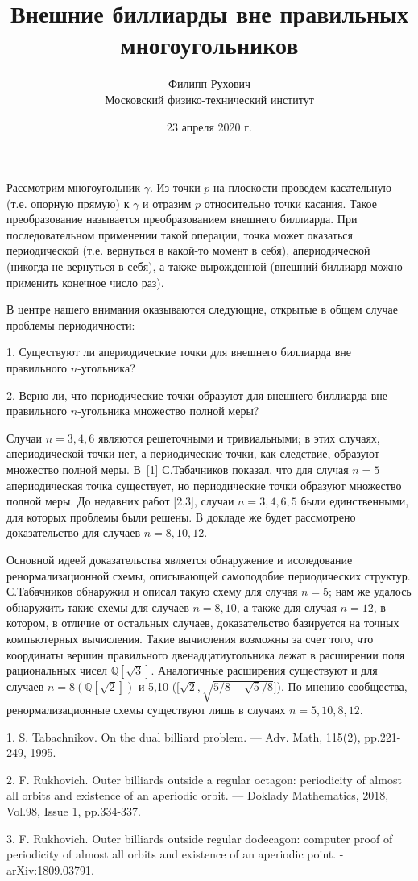 \documentclass{article}
\title{Внешние биллиарды вне правильных многоугольников}
\author{Филипп Рухович\\Московский физико-технический институт}
\date{23 апреля 2020 г.}
\begin{document}
\maketitle

Рассмотрим многоугольник $\gamma$. Из точки $p$ на плоскости проведем касательную (т.е. опорную прямую) к $\gamma$ и отразим $p$ относительно точки касания. Такое преобразование называется преобразованием внешнего биллиарда. При последовательном применении такой операции, точка может оказаться периодической (т.е. вернуться в какой-то момент в себя), апериодической (никогда не вернуться в себя), а также вырожденной (внешний биллиард можно применить конечное число раз).

В центре нашего внимания оказываются следующие, открытые в общем случае проблемы периодичности:

1. Существуют ли апериодические точки для внешнего биллиарда вне правильного $n$-угольника?

2. Верно ли, что периодические точки образуют для внешнего биллиарда вне правильного $n$-угольника множество полной меры?

Случаи $n = 3, 4, 6$ являются решеточными и тривиальными; в этих случаях, апериодической точки нет, а периодические точки, как следствие, образуют множество полной меры. В~[1] С.Табачников показал, что для случая $n = 5$ апериодическая точка существует, но периодические точки образуют множество полной меры. До недавних работ [2,3], случаи $n = 3,4,6,5$ были единственными, для которых проблемы были решены. В докладе же будет рассмотрено доказательство для случаев $n = 8, 10, 12$.

Основной идеей доказательства является обнаружение и исследование ренормализационной схемы, описывающей самоподобие периодических структур. С.Табачников обнаружил и описал такую схему для случая $n = 5$; нам же удалось обнаружить такие схемы для случаев $n = 8, 10$, а также для случая $n = 12$, в котором, в отличие от остальных случаев, доказательство базируется на точных компьютерных вычисления. Такие вычисления возможны за счет того, что координаты вершин правильного
двенадцатиугольника лежат в расширении поля рациональных чисел $\mathbb{Q}[\sqrt 3]$. Аналогичные 
расширения существуют и для случаев $n = 8 (\mathbb{Q}[\sqrt 2])$ и 5,10 ($\mathbb[\sqrt2,\sqrt{5/8 - \sqrt5/8}]$). По мнению сообщества, ренормализационные схемы существуют лишь в случаях $n = 5, 10, 8, 12$.


1. S. Tabachnikov. On the dual billiard problem. — Adv. Math, 115(2), pp.221-249, 1995.

2. F. Rukhovich. Outer billiards outside a regular octagon: periodicity of almost all orbits and existence of an aperiodic orbit. — Doklady Mathematics, 2018, Vol.98, Issue 1, pp.334-337.

3. F. Rukhovich. Outer billiards outside regular dodecagon: computer proof of periodicity of almost all orbits and existence of an aperiodic point. - arXiv:1809.03791.
\end{document}
